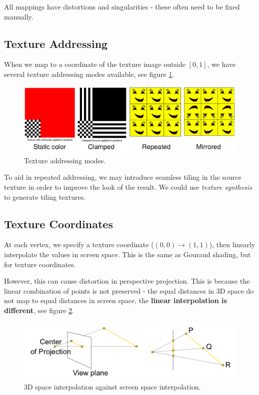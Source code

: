 \documentclass[11pt]{article}
\begin{document}
All mappings have distortions and singularities - these often need to be fixed manually.

\subsection{Texture Addressing}
When we map to a coordinate of the texture image outside $[0, 1]$, we have several texture addressing modes available, see figure \ref{fig:addressing}.

\begin{figure}[htb!]
  \centering
  \caption{Texture addressing modes.}
  \label{fig:addressing}
  \includegraphics[scale=0.3]{addressing}
\end{figure}

To aid in repeated addressing, we may introduce seamless tiling in the source texture in order to improve the look of the result.
We could use \textit{texture synthesis} to generate tiling textures.

\subsection{Texture Coordinates}
At each vertex, we specify a texture coordinate ($(0, 0) \rightarrow (1, 1)$), then linearly interpolate the values in screen space.
This is the same as Gouraud shading, but for texture coordinates.

However, this can cause distortion in perspective projection.
This is because the linear combination of points is not preserved - the equal distances in 3D space do not map to equal distances in screen space, the \textbf{linear interpolation is different}, see figure \ref{fig:distortion}.

\begin{figure}[htb!]
  \centering
  \caption{3D space interpolation against screen space interpolation.}
  \label{fig:distortion}
  \includegraphics[scale=0.3]{distortion}
\end{figure}
\end{document}
